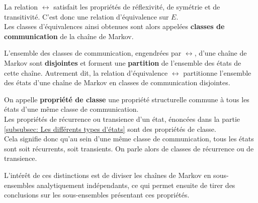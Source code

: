 \documentclass{article}
\begin{document}
\begin{tcolorbox}[colback=white,colframe=green!80!black,title=Démonstration, breakable]
La relation $\leftrightarrow$ satisfait les propriétés de réflexivité, de symétrie et de transitivité. C'est donc une relation d'équivalence sur $E$. \\
Les classes d'équivalences ainsi obtenues sont alors appelées \textbf{classes de communication} de la chaîne de Markov.
\end{tcolorbox}

L'ensemble des classes de communication, engendrées par $\leftrightarrow$, d'une chaîne de Markov sont \textbf{disjointes} et forment une \textbf{partition} de l'ensemble des états de cette chaîne.
Autrement dit, la relation d'équivalence $\leftrightarrow$ partitionne l'ensemble des états d'une chaîne de Markov en classes de communication disjointes. \\

\begin{tcolorbox}[colback=white,colframe=blue!80!black,title=Propriétés de classe]
On appelle \textbf{propriété de classe} une propriété structurelle commune à tous les états d'une même classe de communication. \\

Les propriétés de récurrence ou transience d'un état, énoncées dans la partie \ref{subsubsec: Les différents types d'états} sont des propriétés de classe. \\

Cela signifie donc qu'au sein d'une même classe de communication, tous les états sont soit récurrents, soit transients. On parle alors de classes de récurrence ou de transience.
\end{tcolorbox}

L'intérêt de ces distinctions est de diviser les chaînes de Markov en sous-ensembles analytiquement indépendants, ce qui permet ensuite de tirer des conclusions sur les sous-ensembles présentant ces propriétés. \\
\end{document}
